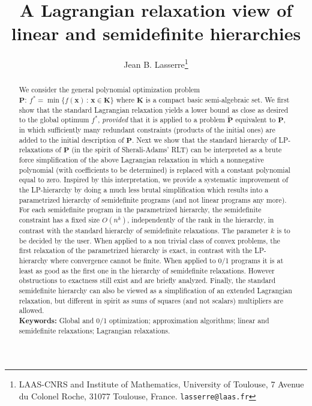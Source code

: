 \documentclass[11pt]{article}
\title{A Lagrangian relaxation view of linear and semidefinite hierarchies}
\author{Jean B. Lasserre\thanks{LAAS-CNRS and Institute of Mathematics,
       University of Toulouse,  7 Avenue du Colonel Roche,
       31077 Toulouse, France. {\tt lasserre@laas.fr}}}
\numberwithin{equation}{section}
\def\x{\mathbf{x}}
\def\K{\mathbf{K}}
\def\P{\mathbf{P}}
\begin{document}
\date{}
\maketitle
\begin{abstract}
We consider the general polynomial optimization problem
$\P:\:f^*=\min \{f(\x)\,:\,\x\in\K\}$
where $\K$ is a compact basic semi-algebraic set.  We first show that the standard Lagrangian relaxation
yields a lower bound as close as desired to 
the global optimum $f^*$, {\em provided} that it is applied 
to a problem $\tilde{\P}$ equivalent to $\P$, in which sufficiently many
redundant constraints (products  of the initial ones) are added to the initial description of $\P$.
Next we show that the standard hierarchy of LP-relaxations of $\P$ (in the spirit of Sherali-Adams' RLT)
can be interpreted as a brute force simplification of the above Lagrangian relaxation
in which a nonnegative polynomial (with coefficients to be determined) is replaced with a constant polynomial equal to zero.
Inspired by this interpretation, we provide a systematic improvement of the LP-hierarchy
by doing a much less brutal simplification which results into a parametrized hierarchy of semidefinite programs
(and not linear programs any more).
For each semidefinite program in the parametrized hierarchy, the semidefinite constraint 
has a fixed size $O(n^k)$, independently of the rank in the hierarchy, in contrast with the standard hierarchy of semidefinite relaxations.
The parameter $k$
is to be decided by the user. When applied to a non trivial class of convex problems,
the first relaxation of the parametrized hierarchy is exact, in contrast with the 
LP-hierarchy where convergence cannot be finite. When applied to 0/1 programs
it is at least as good as the first one in the hierarchy of semidefinite relaxations.
However obstructions to exactness still exist and are briefly analyzed.
Finally, the standard semidefinite hierarchy can also be viewed as a simplification of
an extended Lagrangian relaxation, but different in spirit as sums of squares (and not scalars) multipliers are allowed.\\
{\bf Keywords:} Global and 0/1 optimization; approximation algorithms; linear and semidefinite relaxations; Lagrangian relaxations.
\end{abstract}
\end{document}
